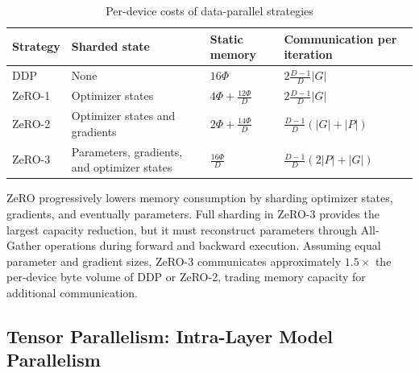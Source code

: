 \documentclass[11pt,journal,final, onecolumn]{IEEEtran}
\begin{document}
\begin{table}[htbp]
    \centering
    \caption{Per-device costs of data-parallel strategies}
    \label{tab:zero-costs}
    \footnotesize
    \renewcommand{\arraystretch}{1.2}
    \begin{tabularx}{\textwidth}{
            >{\raggedright\arraybackslash}p{}
            >{\raggedright\arraybackslash}X
            >{\centering\arraybackslash}p{}
            >{\centering\arraybackslash}p{}
        }
        \toprule
        \textbf{Strategy}
         & \textbf{Sharded state}
         & \textbf{Static memory}
         & \textbf{Communication per iteration}        \\
        \midrule

        DDP
         & None
         & \(16\Phi\)
         & \(2\frac{D-1}{D}\lvert G\rvert\)            \\

        ZeRO-1
         & Optimizer states
         & \(4\Phi+\frac{12\Phi}{D}\)
         & \(2\frac{D-1}{D}\lvert G\rvert\)            \\

        ZeRO-2
         & Optimizer states and gradients
         & \(2\Phi+\frac{14\Phi}{D}\)
         & \(\frac{D-1}{D}
        (\lvert G\rvert+\lvert P\rvert)\)              \\

        ZeRO-3
         & Parameters, gradients, and optimizer states
         & \(\frac{16\Phi}{D}\)
         & \(\frac{D-1}{D}
        (2\lvert P\rvert+\lvert G\rvert)\)             \\

        \bottomrule
    \end{tabularx}
\end{table}

ZeRO progressively lowers memory consumption by sharding optimizer states,
gradients, and eventually parameters. Full sharding in ZeRO-3 provides the
largest capacity reduction, but it must reconstruct parameters through
All-Gather operations during forward and backward execution. Assuming equal
parameter and gradient sizes, ZeRO-3 communicates approximately \(1.5\times\)
the per-device byte volume of DDP or ZeRO-2, trading memory capacity for
additional communication.

\subsection{Tensor Parallelism: Intra-Layer Model Parallelism}
\label{subsec:tensor-parallelism}
\end{document}
